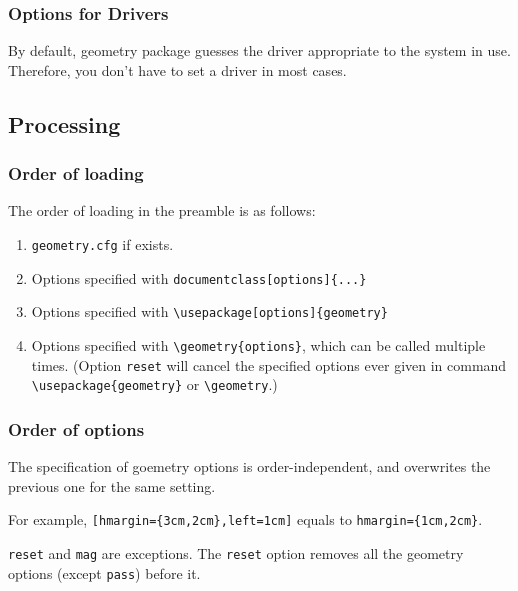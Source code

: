 \documentclass[a4paper,oneside]{book}
\begin{document}
\subsubsection{Options for Drivers}
By default, \textsf{geometry} package guesses the driver appropriate to the system in use. Therefore, you don't have to set a driver in most cases.


\subsection{Processing}
\subsubsection{Order of loading}
The order of loading in the preamble is as follows:
\begin{enumerate}
  \item \verb|geometry.cfg| if exists.
  \item Options specified with \verb|documentclass[options]{...}|
  \item Options specified with \verb|\usepackage[options]{geometry}|
  \item Options specified with \verb|\geometry{options}|, which can be called multiple times. (Option \texttt{reset} will cancel the specified options ever given in command \verb|\usepackage{geometry}| or \verb|\geometry|.)
\end{enumerate}

\subsubsection{Order of options}
The specification of \textsf{goemetry} options is order-independent, and overwrites the previous one for the same setting. 

For example, \verb|[hmargin={3cm,2cm},left=1cm]| equals to \verb|hmargin={1cm,2cm}|.

\texttt{reset} and \texttt{mag} are exceptions. The \texttt{reset} option removes all the geometry options (except \texttt{pass}) before it.
\end{document}
